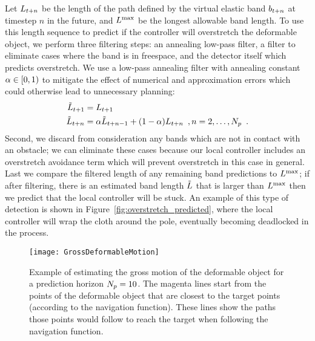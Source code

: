 Let $L_{t+n}$ be the length of the path defined by the virtual elastic band $b_{t+n}$ at timestep $n$ in the future, and $L^\textrm{max}$ be the longest allowable band length. To use this length sequence to predict if the controller will overstretch the deformable object, we perform three filtering steps: an annealing low-pass filter, a filter to eliminate cases where the band is in freespace, and the detector itself which predicts overstretch. We use a low-pass annealing filter with annealing constant $\alpha \in [0, 1)$ to mitigate the effect of numerical and approximation errors which could otherwise lead to unnecessary planning:
\begin{equation}
    \begin{split}
        \tilde {L}_{t + 1} &= L_{t + 1} \\
        \tilde {L}_{t + n} &= \alpha \tilde {L}_{t + n - 1} + (1 - \alpha) L_{t + n} \enspace ,  n = 2, \dots, N_p \enspace .
    \end{split}
\end{equation}
Second, we discard from consideration any bands which are not in contact with an obstacle; we can eliminate these cases because our local controller includes an overstretch avoidance term which will prevent overstretch in this case in general. Last we compare the filtered length of any remaining band predictions to $L^\textrm{max}$; if after filtering, there is an estimated band length $\tilde {L}$ that is larger than $L^\textrm{max}$ then we predict that the local controller will be stuck. An example of this type of detection is shown in Figure~\ref{fig:overstretch_predicted}, where the local controller will wrap the cloth around the pole, eventually becoming deadlocked in the process.




\begin{figure}[ht]
    \centering
    \texttt{[image: GrossDeformableMotion]}
    \caption{Example of estimating the gross motion of the deformable object for a prediction horizon $N_p = 10$. The magenta lines start from the points of the deformable object that are closest to the target points (according to the navigation function). These lines show the paths those points would follow to reach the target when following the navigation function.}
    \label{fig:gross_deformable_motion}
\end{figure}

